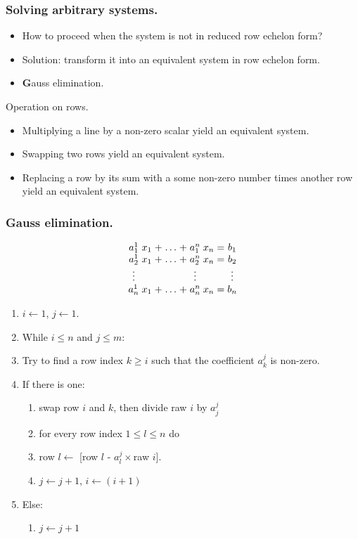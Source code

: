 \documentclass{beamer}
\begin{document}
\begin{frame}
  \frametitle{Solving arbitrary systems.}
  \begin{itemize}
  \item How to proceed when the system is not in reduced row echelon form?
  \item Solution: transform it into an equivalent system in row echelon form.
  \item {\textbf Gauss elimination.}
  \end{itemize}
\end{frame}

\begin{frame}{Operation on rows.}
  \begin{itemize}
  \item Multiplying a line by a non-zero scalar yield an equivalent system.
  \item Swapping two rows yield an equivalent system.
  \item Replacing a row by its sum with a some non-zero number times another row yield an equivalent system. 
  \end{itemize}
\end{frame}

\begin{frame}
  \frametitle{Gauss elimination.}
  \[
  \arraycolsep=1.4pt%
  \begin{array}{ccccccccc}
    a^1_1 & x_1 & + & \dots & + & a^n_1 & x_n & = & b_1 \\
    a^1_2 & x_1 & + & \dots & + & a^n_2 & x_n & = & b_2\\
    \vdots&     &   &      &  &\vdots&     &   & \vdots\\
    a^1_n & x_1 & + & \dots & + &  a^n_n & x_n & = & b_n\\
  \end{array}
  \]
  
  \begin{enumerate}
  \item $i \leftarrow 1$, $j \leftarrow 1$.

  \item While $i \le n$ and $j \le m$:
  \item Try to find a row index $k \ge i$ such that the coefficient $a^j_k$ is non-zero.
  \item If there is one:
    \begin{enumerate}
    \item swap row $i$ and $k$, then divide raw $i$ by $a^{j}_j$
    \item for every row index $1 \le l \le n$ do 
    \item row $l \leftarrow$ [row $l$ - $a^j_l\times$raw $i$].
    \item $j \leftarrow j+1$, $i \leftarrow (i+1)$
    \end{enumerate}
  \item Else:
    \begin{enumerate}
    \item $j \leftarrow j+1$
    \end{enumerate}
  \end{enumerate}
\end{frame}
\end{document}
